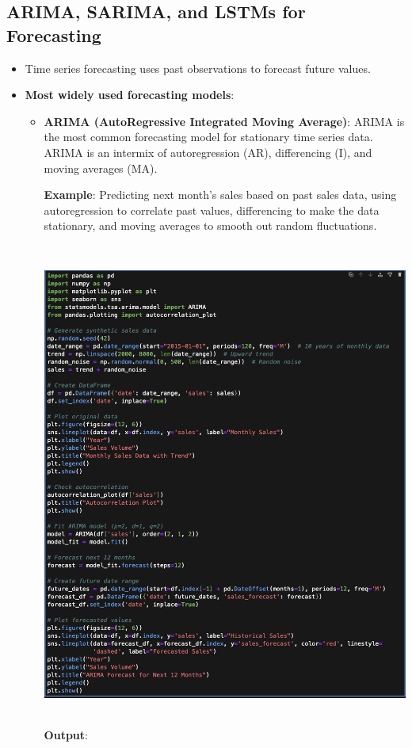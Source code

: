 \documentclass{article}
\begin{document}
\subsection{ARIMA, SARIMA, and LSTMs for Forecasting}
\begin{itemize}
\item Time series forecasting uses past observations to forecast future values.
\item \textbf{Most widely used forecasting models}:
\begin{itemize}
\item \textbf{ARIMA (AutoRegressive Integrated Moving Average)}: ARIMA is the most common forecasting model for stationary time series data. ARIMA is an intermix of autoregression (AR), differencing (I), and moving averages (MA).

\textbf{Example}: Predicting next month’s sales based on past sales data, using autoregression to correlate past values, differencing to make the data stationary, and moving averages to smooth out random fluctuations.

\includegraphics[width=14cm,height=16cm]{ARIMA .png}
\newpage
\textbf{Output}:


\end{itemize}
\end{itemize}
\end{document}
